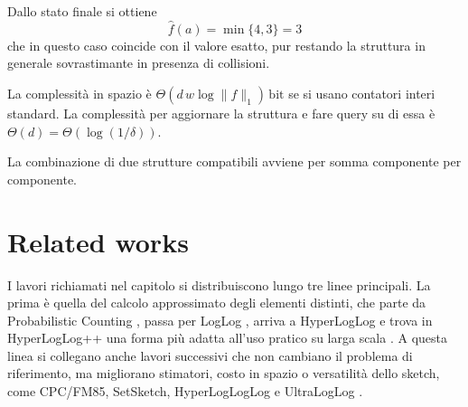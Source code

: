 \begin{table}[htbp]
    \centering
    \small
    \setlength{\tabcolsep}{4pt}
    \renewcommand{\arraystretch}{1.1}
    \caption{Esempio operativo di Count-Min Sketch}
    \label{tab:cms-esempio}
\end{table}

Dallo stato finale si ottiene
\[
\hat f(a)=\min\{4,3\}=3
\]
che in questo caso coincide con il valore esatto, pur restando la struttura in
generale sovrastimante in presenza di collisioni.

La complessità in spazio è \(\Theta(d\,w\log\|f\|_1)\,\text{bit}\)
se si usano contatori interi standard. La complessità per aggiornare la struttura e fare query su di essa è \(\Theta(d)=\Theta(\log(1/\delta))\).

La combinazione di due strutture compatibili avviene per somma componente per
componente.

\section{Related works}
I lavori richiamati nel capitolo si distribuiscono lungo tre linee principali.
La prima è quella del calcolo approssimato degli elementi distinti, che parte da
Probabilistic Counting \cite{Flajolet_Martin_1985}, passa per LogLog
\cite{Durand_Flajolet_2003}, arriva a HyperLogLog
\cite{Flajolet_Fusy_Gandouet_Meunier_2007} e trova in HyperLogLog++ una forma
più adatta all'uso pratico su larga scala \cite{Heule_Nunkesser_Hall_2013}. A
questa linea si collegano anche lavori successivi che non cambiano il problema
di riferimento, ma migliorano stimatori, costo in spazio o versatilità dello
sketch, come CPC/FM85, SetSketch, HyperLogLogLog e UltraLogLog
\cite{Lang_2017_CPC,Ertl_2021_SetSketch,Karppa_Pagh_2022_HyperLogLogLog,Ertl_2024_UltraLogLog}.

